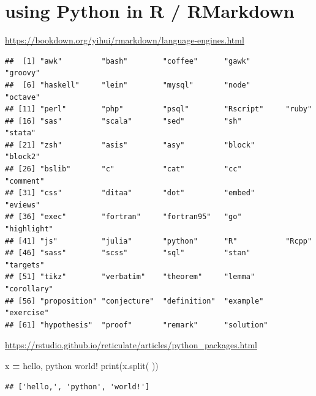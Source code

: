 \documentclass[
]{book}
\newenvironment{Shaded}{\begin{snugshade}}{\end{snugshade}}
\newcommand{\BuiltInTok}[1]{#1}
\newcommand{\FunctionTok}[1]{\textcolor[rgb]{0.13,0.29,0.53}{\textbf{#1}}}
\newcommand{\NormalTok}[1]{#1}
\newcommand{\OperatorTok}[1]{\textcolor[rgb]{0.81,0.36,0.00}{\textbf{#1}}}
\newcommand{\SpecialCharTok}[1]{\textcolor[rgb]{0.81,0.36,0.00}{\textbf{#1}}}
\newcommand{\StringTok}[1]{\textcolor[rgb]{0.31,0.60,0.02}{#1}}
\theoremstyle{definition}
\theoremstyle{definition}
\theoremstyle{definition}
\theoremstyle{definition}
\theoremstyle{remark}
\begin{document}
\hypertarget{using-python-in-r-rmarkdown}{%
\section{using Python in R / RMarkdown}\label{using-python-in-r-rmarkdown}}

\url{https://bookdown.org/yihui/rmarkdown/language-engines.html}

\begin{Shaded}
\end{Shaded}

\begin{verbatim}
##  [1] "awk"         "bash"        "coffee"      "gawk"        "groovy"     
##  [6] "haskell"     "lein"        "mysql"       "node"        "octave"     
## [11] "perl"        "php"         "psql"        "Rscript"     "ruby"       
## [16] "sas"         "scala"       "sed"         "sh"          "stata"      
## [21] "zsh"         "asis"        "asy"         "block"       "block2"     
## [26] "bslib"       "c"           "cat"         "cc"          "comment"    
## [31] "css"         "ditaa"       "dot"         "embed"       "eviews"     
## [36] "exec"        "fortran"     "fortran95"   "go"          "highlight"  
## [41] "js"          "julia"       "python"      "R"           "Rcpp"       
## [46] "sass"        "scss"        "sql"         "stan"        "targets"    
## [51] "tikz"        "verbatim"    "theorem"     "lemma"       "corollary"  
## [56] "proposition" "conjecture"  "definition"  "example"     "exercise"   
## [61] "hypothesis"  "proof"       "remark"      "solution"
\end{verbatim}

\url{https://rstudio.github.io/reticulate/articles/python_packages.html}

\begin{Shaded}
\begin{Highlighting}[]
\NormalTok{x }\OperatorTok{=} \StringTok{\textquotesingle{}hello, python world!\textquotesingle{}}
\BuiltInTok{print}\NormalTok{(x.split(}\StringTok{\textquotesingle{} \textquotesingle{}}\NormalTok{))}
\end{Highlighting}
\end{Shaded}

\begin{verbatim}
## ['hello,', 'python', 'world!']
\end{verbatim}
\end{document}
